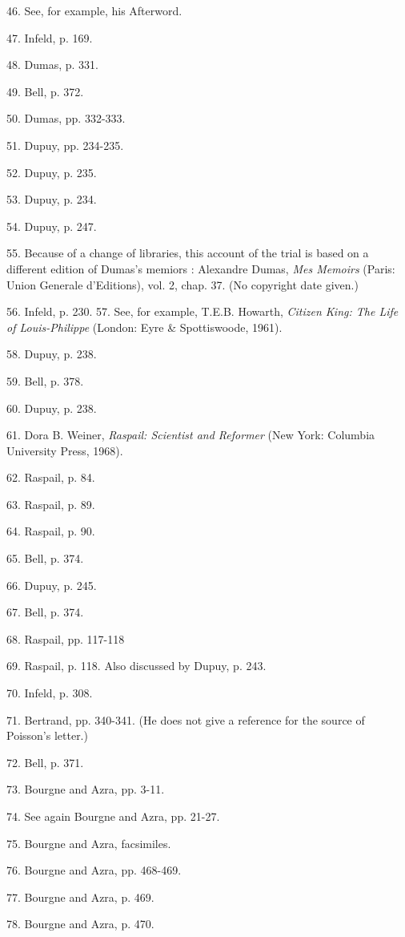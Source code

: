\documentclass[12pt]{article}
\begin{document}
46. See, for example, his Afterword. 

47. Infeld, p. 169. 

48. Dumas, p. 331. 

49. Bell, p. 372. 

50. Dumas, pp. 332-333. 

51. Dupuy, pp. 234-235. 

52. Dupuy, p. 235. 

53. Dupuy, p. 234. 

54. Dupuy, p. 247. 

55. Because of a change of libraries, this account of the trial is based on a different edition of Dumas's memiors
: Alexandre Dumas, {\it Mes Memoirs} (Paris: Union Generale d'Editions), vol. 2, chap. 37. (No copyright date given.) 

56. Infeld, p. 230. 57. See, for example, T.E.B. Howarth, \emph{Citizen King: The Life of Louis-Philippe} (London: Eyre \&
Spottiswoode, 1961). 

58. Dupuy, p. 238. 

59. Bell, p. 378. 

60. Dupuy, p. 238. 

61. Dora B. Weiner, \emph{Raspail: Scientist and Reformer} (New York: Columbia University Press, 1968). 

62. Raspail, p. 84. 

63. Raspail, p. 89. 

64. Raspail, p. 90. 

65. Bell, p. 374. 

66. Dupuy, p. 245. 

67. Bell, p. 374. 

68. Raspail, pp. 117-118 

69. Raspail, p. 118. Also discussed by Dupuy, p. 243. 

70. Infeld, p. 308. 

71. Bertrand, pp. 340-341. (He does not give a reference for the source of Poisson's letter.) 

72. Bell, p. 371. 

73. Bourgne and Azra, pp. 3-11. 

74. See again Bourgne and Azra, pp. 21-27. 

75. Bourgne and Azra, facsimiles. 

76. Bourgne and Azra, pp. 468-469. 

77. Bourgne and Azra, p. 469. 

78. Bourgne and Azra, p. 470. 
\end{document}
